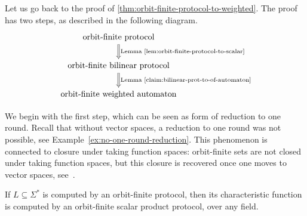 Let us go back to the proof of \cref{thm:orbit-finite-protocol-to-weighted}. The proof has two steps, as described in the following diagram.
\[
\begin{tikzcd}
\text{orbit-finite protocol}
\ar[d,Rightarrow,"\text{Lemma~\ref{lem:orbit-finite-protocol-to-scalar}}"]
\\
\text{orbit-finite bilinear protocol}
\ar[d,Rightarrow, "\text{Lemma~\ref{claim:bilinear-prot-to-of-automaton}}"]
\\
\text{orbit-finite weighted automaton}
\end{tikzcd}
\]

We begin with the first step, which can be seen as form of reduction to one round. Recall that without vector spaces, a reduction to one round was not possible, see Example~\ref{ex:no-one-round-reduction}. This phenomenon is connected to closure under taking function spaces: orbit-finite sets are not closed under taking function spaces, but this closure is recovered once one moves to vector spaces, see~\cite[Section 8.3]{bojanczyk_slightly}.

\begin{lemma}\label{lem:orbit-finite-protocol-to-scalar}
    If $L \subseteq \Sigma^*$ is computed by an orbit-finite protocol, then its characteristic function is computed by an orbit-finite scalar product protocol, over any field.
\end{lemma}


